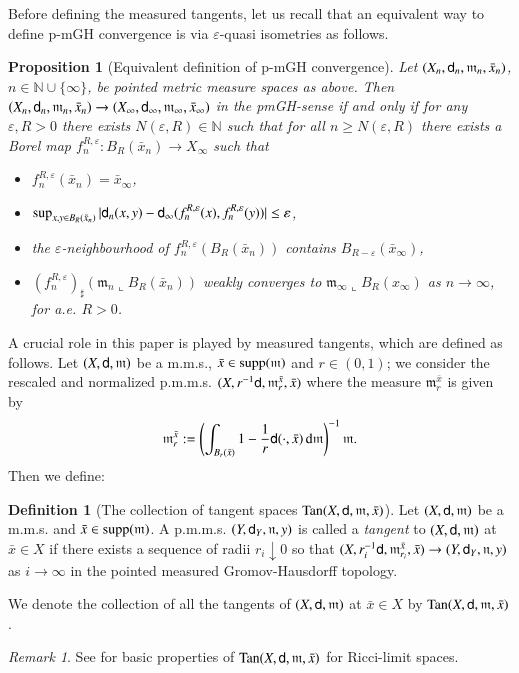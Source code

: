 \documentclass[11pt,reqno]{amsart}
\newcommand{\supp}{\mathop{\rm supp}\nolimits}
\newcommand{\mm}{\mathfrak m}
\newcommand{\nn}{\mathfrak n}
\newcommand{\sfd}{{\sf d}}
\renewcommand{\d}{{\rm{d}}}
\newcommand{\N}{\mathbb{N}}
\newcommand{\Tan}{{\rm Tan}}
\newcommand{\vare}{\varepsilon}
\newtheorem{proposition}[theorem]{Proposition}
\theoremstyle{definition}
\newtheorem{definition}[theorem]{Definition}
\theoremstyle{remark}
\newtheorem{remark}{Remark}[section]
\theoremstyle{remark}
\theoremstyle{remark}
\theoremstyle{remark}
\theoremstyle{remark}
\theoremstyle{remark}
\theoremstyle{remark}
\begin{document}
Before defining the measured tangents, let us recall that an equivalent way to define p-mGH convergence is via $\vare$-quasi isometries as follows.
\begin{proposition}[Equivalent definition of p-mGH convergence]
Let $(X_n,\sfd_n,\mm_n,\bar x_n)$, $n\in\N\cup\{\infty\}$,
be pointed metric measure spaces as above. Then  $(X_n,\sfd_n,\mm_n,\bar x_n)\to
(X_\infty,\sfd_\infty,\mm_\infty,\bar x_\infty)$ in the pmGH-sense if and only if  for any $\vare,R>0$ there exists $N({\vare,R})\in \N$ such that for all $n\geq N({\vare,R})$ there exists a Borel map $f^{R,\vare}_n:B_R(\bar x_n)\to X_\infty$ such that
\begin{itemize}
\item $f^{R,\vare}_n(\bar x_n)=\bar x_\infty$,
\item $\sup_{x,y\in B_R(\bar x_n)}|\sfd_n(x,y)-\sfd_\infty(f^{R,\vare}_n(x),f^{R,\vare}_n(y))|\leq\vare$,
\item the $\vare$-neighbourhood of $f^{R,\vare}_n(B_R(\bar x_n))$ contains $B_{R-\vare}(\bar x_\infty)$,
\item  $(f^{R,\vare}_n)_\sharp(\mm_n\llcorner{B_R(\bar x_n)})$ weakly converges to $\mm_\infty\llcorner{B_R(x_\infty)}$ as $n\to\infty$, for a.e. $R>0$.
\end{itemize}
 \end{proposition}
\bigskip

A crucial role in this paper is played by measured tangents, which are defined as follows. Let  $(X,\sfd,\mm)$ be a m.m.s.,  $\bar x\in \supp(\mm)$ and $r\in(0,1)$; we consider the rescaled and normalized p.m.m.s. $(X,r^{-1}\sfd,\mm^{\bar{x}}_r,\bar x)$ where the measure $\mm^{\bar x}_r$ is given by
\begin{equation}
\label{eq:normalization}
\mm^{\bar x}_r:=\left(\int_{B_r(\bar x)}1-\frac 1r\sfd(\cdot,\bar x)\,\d\mm\right)^{-1}\mm.
\end{equation}
Then we define:
\begin{definition}[The collection of tangent spaces $\Tan(X,\sfd,\mm,\bar{x})$]
Let  $(X,\sfd,\mm)$ be a m.m.s. and  $\bar x\in \supp(\mm)$. A p.m.m.s.  $(Y,\sfd_Y,\nn,y)$ is called a
\emph{tangent} to $(X,\sfd,\mm)$ at $\bar{x} \in X$ if there exists a sequence of radii $r_i \downarrow 0$ so that
$(X,r_i^{-1}\sfd,\mm^{\bar{x}}_{r_i},\bar{x}) \to (Y,\sfd_Y,\nn,y)$ as 
$i \to \infty$ in the pointed measured Gromov-Hausdorff topology.

We denote the collection of all the tangents of $(X,\sfd,\mm)$ at 
$\bar{x} \in X$ by $\Tan(X,\sfd,\mm,\bar{x})$. 
\end{definition}
\begin{remark}
See \cite{CN13} for basic properties of $\Tan(X,\sfd,\mm,\bar{x})$ for Ricci-limit spaces.
\end{remark}
\end{document}
